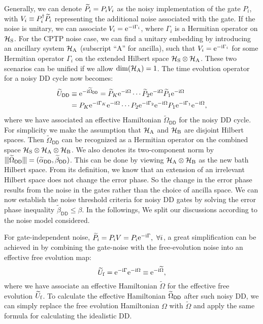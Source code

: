 \documentclass[aps,pra,reprint,superscriptaddress]{revtex4-2}
\begin{document}
Generally, we can denote $\widetilde{P}_i =  P_i V_i$ as the noisy implementation of the gate $P_i$,
with $V_i\equiv P_i^\dagger \widetilde{P}_i$ representing the additional noise associated with the gate. 
If the noise is unitary, we can associate $V_i=\mathrm{e}^{-\mathrm{i} \Gamma_i}$, where $\Gamma_i$ is a Hermitian operator on $\mathcal{H}_{\mathrm{S}}$. 
For the CPTP noise case, we can find a unitary embedding by introducing an ancillary system $\mathcal{H}_{\mathrm{A}}$ (subscript ``A'' for ancilla), such that $V_i=\mathrm{e}^{-\mathrm{i} \Gamma_i}$ for some  Hermitian operator $\Gamma_i$ on the extended Hilbert space $\mathcal{H}_{\mathrm{S}}\otimes \mathcal{H}_{\mathrm{A}}$. These two scenarios can be unified if 
we allow $\dim(\mathcal{H}_{\mathrm{A}})=1$.  
The time evolution operator for a noisy DD cycle now becomes:
\begin{equation}\label{eq:UDD-noisy}
\begin{split}
\widetilde U_{\mathsf{DD}} &\equiv \mathrm{e}^{-\mathrm{i} \widetilde\Omega_{\mathsf{DD}}} = \widetilde{P}_K \mathrm{e}^{-\mathrm{i} \Omega}   \cdots \widetilde{P}_2 \mathrm{e}^{-\mathrm{i} \Omega} \widetilde{P}_1 \mathrm{e}^{-\mathrm{i} \Omega}  \\
&=     P_K \mathrm{e}^{-\mathrm{i} \Gamma_K} \mathrm{e}^{-\mathrm{i} \Omega}   \cdots P_2 \mathrm{e}^{-\mathrm{i} \Gamma_2} \mathrm{e}^{-\mathrm{i} \Omega}  P_1 \mathrm{e}^{-\mathrm{i} \Gamma_1} \mathrm{e}^{-\mathrm{i} \Omega},
\end{split}
\end{equation}
where we have associated an effective Hamiltonian $\widetilde\Omega_{\mathsf{DD}}$ for the noisy DD cycle. For simplicity we make the assumption that $\mathcal{H}_{\mathrm{A}}$ and $\mathcal{H}_{\mathrm{B}}$ are disjoint Hilbert spaces. Then $\widetilde\Omega_{\mathsf{DD}}$ can be recognized as a Hermitian operator on the combined space $\mathcal{H}_{\mathrm{S}}\otimes \mathcal{H}_{\mathrm{A}}\otimes \mathcal{H}_{\mathrm{B}}$.
We also denotes its two-component norm by 
$\opnorm{\widetilde\Omega_{\mathsf{DD}}}= (\widetilde{\alpha}_\mathsf{DD},\widetilde{\beta}_\mathsf{DD})$. This can be done by viewing $\mathcal{H}_{\mathrm{A}}\otimes \mathcal{H}_{\mathrm{B}}$ as the new bath Hilbert space.
From its definition, we know that an extension of an irrelevant Hilbert space does not change the error phase.
So the change in the error phase results from the noise in the gates rather than the choice of ancilla space. 
We can now establish the noise threshold criteria for noisy DD gates by solving the error phase inequality $\widetilde{\beta}_\mathsf{DD}\le \beta$.
In the followings, We split our discussions according to the noise model considered.


 For gate-independent noise, 
 $\widetilde{P}_i = P_i V = P_i \mathrm{e}^{-\mathrm{i} \Gamma},\ \forall i$, a great simplification can be achieved in  by combining the gate-noise with the free-evolution noise into an effective free evolution map:
\begin{equation}\label{eq:noisy-merge}
    \widetilde{U}_{\mathrm{f}} =  \mathrm{e}^{-\mathrm{i} \Gamma} \mathrm{e}^{-\mathrm{i} \Omega} \equiv 
    \mathrm{e}^{-\mathrm{i} \widetilde\Omega},
\end{equation}
where we have associate an effective Hamiltonian $\widetilde\Omega$ for the effective free evolution $\widetilde{U}_{\mathrm{f}}$. To calculate the effective Hamiltonian $\widetilde\Omega_{\mathsf{DD}}$ after such noisy DD,
we can simply replace the free evolution Hamiltonian $\Omega$ with $\widetilde{\Omega}$ and apply the same formula for calculating the idealistic DD.
\end{document}
